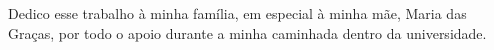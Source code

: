 
\renewcommand{\dedicatorianame}{DEDICATÓRIA}

\begin{dedicatoria}

Dedico esse trabalho à minha família, em especial à minha mãe, Maria das Graças, por todo o apoio durante a minha caminhada dentro da universidade.

\end{dedicatoria}
